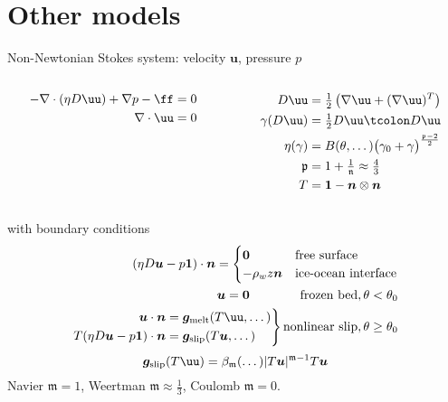 \documentclass{beamer}
\begin{document}
\section{Other models}

\begin{frame}{Non-Newtonian Stokes system: velocity $\bm u$, pressure $p$}
\begin{columns}
\begin{column}{0.5\textwidth}
  \alert{\begin{align*}
    -\nabla \cdot(\eta D\uu) + \nabla p - \ff &= 0 \\
    \nabla \cdot \uu &= 0
  \end{align*}}
\end{column}
\begin{column}{0.5\textwidth}
    \begin{align*}
      D\uu &= \tfrac 1 2 \left(\nabla \uu + (\nabla \uu)^T \right) \\
      \gamma(D\uu) &= \tfrac 1 2 D\uu \tcolon D\uu \\
      \eta(\gamma) &= B(\theta,\dotsc)\big(\gamma_0 + \gamma \big)^{\frac{\mathfrak{p}-2}{2}} \\
      \mathfrak{p} &= 1 + \tfrac{1}{\mathfrak{n}} \approx \tfrac 4 3 \\
      T &= \bm 1 - \bm n \otimes \bm n \\
    \end{align*}
\end{column}
\end{columns}
\vspace{-1.5em}
    with boundary conditions
    \begin{align*}
      (\eta D\bm u - p\bm 1)\cdot\bm n =
      \begin{cases}\bm 0 & \text{free surface} \\
        -\rho_w z \bm n & \text{ice-ocean interface}\end{cases} \\
      \bm u = \bm 0\qquad\qquad \text{frozen bed}, \theta < \theta_0 \\
      \left. \begin{aligned}
          \bm u \cdot \bm n &= \bm g_{\text{melt}}(T\uu,\dotsc) \\
          T (\eta D\bm u - p\bm 1)\cdot\bm n &= \bm g_{\text{slip}}(T \bm u,\dotsc) \end{aligned}\right\}
      \text{nonlinear slip}, \theta \ge \theta_0 \\
    \end{align*}
    \vspace{-3em}
    \[ \bm g_{\text{slip}}(T\uu) = \beta_{\mathfrak{m}}(\dotsc) \lvert T\bm u \rvert^{\mathfrak{m}-1} T \bm u \]
    Navier $\mathfrak{m}=1$, \quad Weertman $\mathfrak{m}\approx \frac 1 3$, \quad Coulomb $\mathfrak{m}=0$.
\end{frame}
\end{document}
